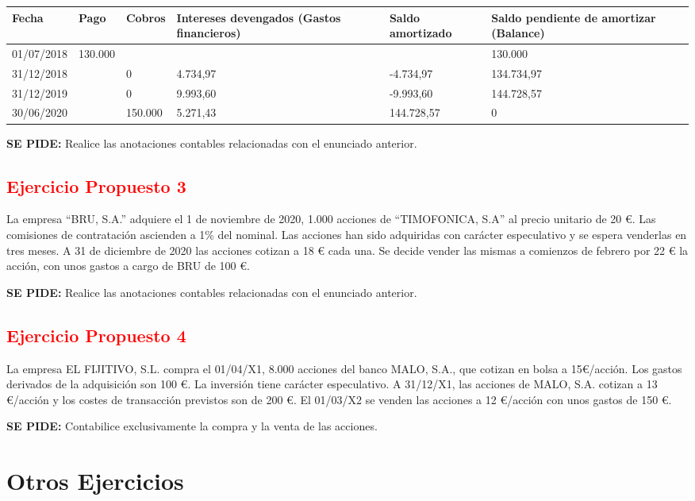 \begin{table}[H]
    \centering
    \begin{tabular}{|p{3cm}|p{2cm}|p{2cm}|p{2cm}|p{2cm}|p{2cm}|}
        \hline
        \textbf{Fecha} & \textbf{Pago} & \textbf{Cobros} & \textbf{Intereses devengados (Gastos financieros)} & \textbf{Saldo amortizado} & \textbf{Saldo pendiente de amortizar (Balance)} \\
        \hline
        01/07/2018 & 130.000 & & & & 130.000 \\
        \hline
        31/12/2018 & & 0& 4.734,97 & -4.734,97 & 134.734,97  \\
        \hline
        31/12/2019 & & 0 & 9.993,60 & -9.993,60 & 144.728,57  \\
        \hline
        30/06/2020 & &150.000 & 5.271,43 & 144.728,57 & 0  \\
        \hline
    \end{tabular}
\end{table}

\textbf{SE PIDE:} Realice las anotaciones contables relacionadas con el enunciado anterior.

\subsection*{\textcolor{red}{Ejercicio Propuesto 3}}

La empresa “BRU, S.A.” adquiere el 1 de noviembre de 2020, 1.000 acciones de “TIMOFONICA, S.A” al precio unitario de 20 €. Las comisiones de contratación ascienden a 1\% del nominal. Las acciones han sido adquiridas con carácter especulativo y se espera venderlas en tres meses. A 31 de diciembre de 2020 las acciones cotizan a 18 € cada una. Se decide vender las mismas a comienzos de febrero por 22 € la acción, con unos gastos a cargo de BRU de 100 €.

\textbf{SE PIDE:} Realice las anotaciones contables relacionadas con el enunciado anterior.

\subsection*{\textcolor{red}{Ejercicio Propuesto 4}}

La empresa EL FIJITIVO, S.L. compra el 01/04/X1, 8.000 acciones del banco MALO, S.A., que cotizan en bolsa a 15€/acción. Los gastos derivados de la adquisición son 100 €. La inversión tiene carácter especulativo. A 31/12/X1, las acciones de MALO, S.A. cotizan a 13 €/acción y los costes de transacción previstos son de 200 €. El 01/03/X2 se venden las acciones a 12 €/acción con unos gastos de 150 €.

\textbf{SE PIDE:} Contabilice exclusivamente la compra y la venta de las acciones.

\newpage
\section{Otros Ejercicios}




